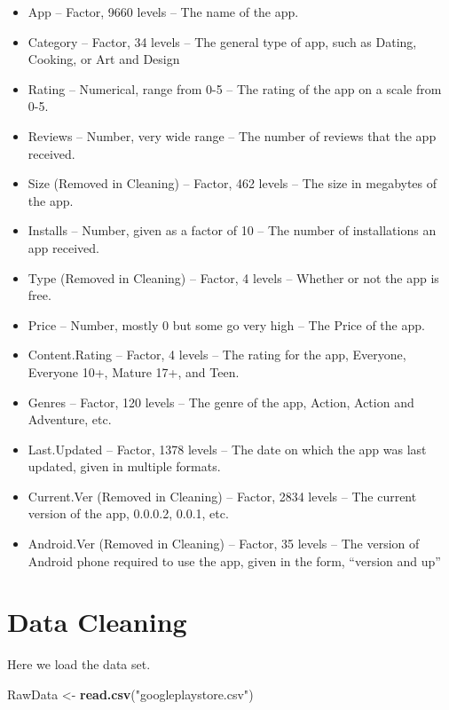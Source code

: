 \documentclass[]{article}
\newenvironment{Shaded}{\begin{snugshade}}{\end{snugshade}}
\newcommand{\KeywordTok}[1]{\textcolor[rgb]{0.13,0.29,0.53}{\textbf{#1}}}
\newcommand{\NormalTok}[1]{#1}
\newcommand{\StringTok}[1]{\textcolor[rgb]{0.31,0.60,0.02}{#1}}
\begin{document}
\begin{itemize}
\item
  App -- Factor, 9660 levels -- The name of the app.
\item
  Category -- Factor, 34 levels -- The general type of app, such as
  Dating, Cooking, or Art and Design
\item
  Rating -- Numerical, range from 0-5 -- The rating of the app on a
  scale from 0-5.
\item
  Reviews -- Number, very wide range -- The number of reviews that the
  app received.
\item
  Size (Removed in Cleaning) -- Factor, 462 levels -- The size in
  megabytes of the app.
\item
  Installs -- Number, given as a factor of 10 -- The number of
  installations an app received.
\item
  Type (Removed in Cleaning) -- Factor, 4 levels -- Whether or not the
  app is free.
\item
  Price -- Number, mostly 0 but some go very high -- The Price of the
  app.
\item
  Content.Rating -- Factor, 4 levels -- The rating for the app,
  Everyone, Everyone 10+, Mature 17+, and Teen.
\item
  Genres -- Factor, 120 levels -- The genre of the app, Action, Action
  and Adventure, etc.
\item
  Last.Updated -- Factor, 1378 levels -- The date on which the app was
  last updated, given in multiple formats.
\item
  Current.Ver (Removed in Cleaning) -- Factor, 2834 levels -- The
  current version of the app, 0.0.0.2, 0.0.1, etc.
\item
  Android.Ver (Removed in Cleaning) -- Factor, 35 levels -- The version
  of Android phone required to use the app, given in the form, ``version
  and up''
\end{itemize}

\hypertarget{data-cleaning}{%
\section{Data Cleaning}\label{data-cleaning}}

Here we load the data set.

\begin{Shaded}
\begin{Highlighting}[]
\NormalTok{RawData <-}\StringTok{ }\KeywordTok{read.csv}\NormalTok{(}\StringTok{"googleplaystore.csv"}\NormalTok{)}
\end{Highlighting}
\end{Shaded}
\end{document}
